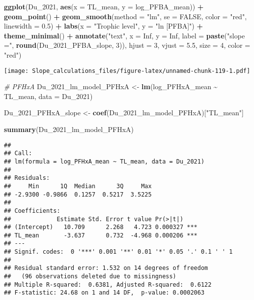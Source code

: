 \documentclass[
]{article}
\newenvironment{Shaded}{\begin{snugshade}}{\end{snugshade}}
\newcommand{\AttributeTok}[1]{\textcolor[rgb]{0.13,0.29,0.53}{#1}}
\newcommand{\CommentTok}[1]{\textcolor[rgb]{0.56,0.35,0.01}{\textit{#1}}}
\newcommand{\ConstantTok}[1]{\textcolor[rgb]{0.56,0.35,0.01}{#1}}
\newcommand{\DecValTok}[1]{\textcolor[rgb]{0.00,0.00,0.81}{#1}}
\newcommand{\FloatTok}[1]{\textcolor[rgb]{0.00,0.00,0.81}{#1}}
\newcommand{\FunctionTok}[1]{\textcolor[rgb]{0.13,0.29,0.53}{\textbf{#1}}}
\newcommand{\NormalTok}[1]{#1}
\newcommand{\OtherTok}[1]{\textcolor[rgb]{0.56,0.35,0.01}{#1}}
\newcommand{\SpecialCharTok}[1]{\textcolor[rgb]{0.81,0.36,0.00}{\textbf{#1}}}
\newcommand{\StringTok}[1]{\textcolor[rgb]{0.31,0.60,0.02}{#1}}
\begin{document}
\begin{Shaded}
\begin{Highlighting}[]
\FunctionTok{ggplot}\NormalTok{(Du\_2021, }\FunctionTok{aes}\NormalTok{(}\AttributeTok{x =}\NormalTok{ TL\_mean, }\AttributeTok{y =}\NormalTok{ log\_PFBA\_mean)) }\SpecialCharTok{+}
  \FunctionTok{geom\_point}\NormalTok{() }\SpecialCharTok{+}
  \FunctionTok{geom\_smooth}\NormalTok{(}\AttributeTok{method =} \StringTok{"lm"}\NormalTok{, }\AttributeTok{se =} \ConstantTok{FALSE}\NormalTok{, }\AttributeTok{color =} \StringTok{"red"}\NormalTok{, }\AttributeTok{linewidth =} \FloatTok{0.5}\NormalTok{) }\SpecialCharTok{+}
  \FunctionTok{labs}\NormalTok{(}\AttributeTok{x =} \StringTok{"Trophic level"}\NormalTok{,}
       \AttributeTok{y =} \StringTok{"ln [PFBA]"}\NormalTok{) }\SpecialCharTok{+}
  \FunctionTok{theme\_minimal}\NormalTok{() }\SpecialCharTok{+}
  \FunctionTok{annotate}\NormalTok{(}\StringTok{"text"}\NormalTok{, }\AttributeTok{x =} \ConstantTok{Inf}\NormalTok{, }\AttributeTok{y =} \ConstantTok{Inf}\NormalTok{, }\AttributeTok{label =} \FunctionTok{paste}\NormalTok{(}\StringTok{"slope ="}\NormalTok{, }\FunctionTok{round}\NormalTok{(Du\_2021\_PFBA\_slope, }\DecValTok{3}\NormalTok{)), }
           \AttributeTok{hjust =} \DecValTok{3}\NormalTok{, }\AttributeTok{vjust =} \FloatTok{5.5}\NormalTok{, }\AttributeTok{size =} \DecValTok{4}\NormalTok{, }\AttributeTok{color =} \StringTok{"red"}\NormalTok{)}
\end{Highlighting}
\end{Shaded}

\texttt{[image: Slope\_calculations\_files/figure-latex/unnamed-chunk-119-1.pdf]}

\begin{Shaded}
\begin{Highlighting}[]
\CommentTok{\# PFHxA}
\NormalTok{Du\_2021\_lm\_model\_PFHxA }\OtherTok{\textless{}{-}} \FunctionTok{lm}\NormalTok{(log\_PFHxA\_mean }\SpecialCharTok{\textasciitilde{}}\NormalTok{ TL\_mean,}
                             \AttributeTok{data =}\NormalTok{ Du\_2021)}

\NormalTok{Du\_2021\_PFHxA\_slope }\OtherTok{\textless{}{-}} \FunctionTok{coef}\NormalTok{(Du\_2021\_lm\_model\_PFHxA)[}\StringTok{"TL\_mean"}\NormalTok{]}

\FunctionTok{summary}\NormalTok{(Du\_2021\_lm\_model\_PFHxA)}
\end{Highlighting}
\end{Shaded}

\begin{verbatim}
## 
## Call:
## lm(formula = log_PFHxA_mean ~ TL_mean, data = Du_2021)
## 
## Residuals:
##     Min      1Q  Median      3Q     Max 
## -2.9300 -0.9866  0.1257  0.5217  3.5225 
## 
## Coefficients:
##             Estimate Std. Error t value Pr(>|t|)    
## (Intercept)   10.709      2.268   4.723 0.000327 ***
## TL_mean       -3.637      0.732  -4.968 0.000206 ***
## ---
## Signif. codes:  0 '***' 0.001 '**' 0.01 '*' 0.05 '.' 0.1 ' ' 1
## 
## Residual standard error: 1.532 on 14 degrees of freedom
##   (96 observations deleted due to missingness)
## Multiple R-squared:  0.6381, Adjusted R-squared:  0.6122 
## F-statistic: 24.68 on 1 and 14 DF,  p-value: 0.0002063
\end{verbatim}
\end{document}
